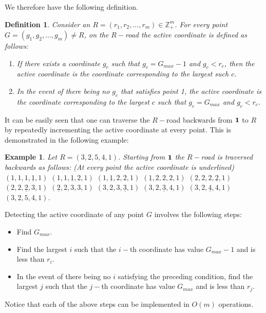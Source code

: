 \documentclass[letterpaper, 12 pt]{article}  \usepackage{amssymb}
\newtheorem{example}[theorem]{Example}
\newtheorem{definition}[theorem]{Definition}
\begin{document}
We therefore have the following definition.
\begin{definition}
Consider an $R = (r_1,r_2,\ldots,r_m) \in \mathbb{Z}_+^m$. For every point $G =
(g_1,g_2,\ldots,g_m) \neq R$, 
on the $R-$road the active coordinate is defined as follows: 
\begin{enumerate}
\item
If there exists a coordinate $g_c$ such that $g_c = G_{max}-1$ and $g_c <r_c$,
then the active coordinate is the coordinate corresponding to the largest such
$c$. 
\item
In the event of there being no $g_c$ that satisfies point 1, the active
coordinate is the
coordinate corresponding to the largest $c$ such that $g_c=G_{max}$ and
$g_c<r_c$.
\end{enumerate}
\end{definition}


 


It can be easily seen that one can traverse the $R-$road backwards from ${\bf 1}$ to $R$
by repeatedly
incrementing the active coordinate at every point. This is demonstrated in the
following example:
\begin{example}
 Let $R = (3, 2, 5, 4, 1)$. Starting from ${\bf 1}$ the $R-$road is traversed
backwards as follows: (At every point the active coordinate is underlined) 
$(1,1,1,{\underline1}, 1)$ $(1,1,{\underline 1},2,1)$ $(1,{\underline1},2,2,1)$
$({\underline1},2,2,2,1)$ $(2,2,2,{\underline2},1)$ $(2,2,{\underline2},3,1)$
$({\underline2},2,3,3,1)$ $(3,2,3,{\underline3},1)$ $(3,2,{\underline3},4,1)$
$(3,2,{\underline4},4,1)$ $(3, 2, 5, 4, 1)$.
\end{example}
 
Detecting the active
coordinate of any point $G$ involves the following steps:
\begin{itemize}
 \item Find $G_{max}$.
 \item Find the largest $i$ such that the $i-$th coordinate has value
$G_{max}-1$ and is less than $r_i$.
 \item In the event of there being no $i$ satisfying the preceding condition, find
the largest $j$ such that
the $j-$th coordinate has value $G_{max}$ and is less than $r_j$.
\end{itemize}

Notice that each of the above steps can be implemented in $O(m)$ operations. 
\end{document}
